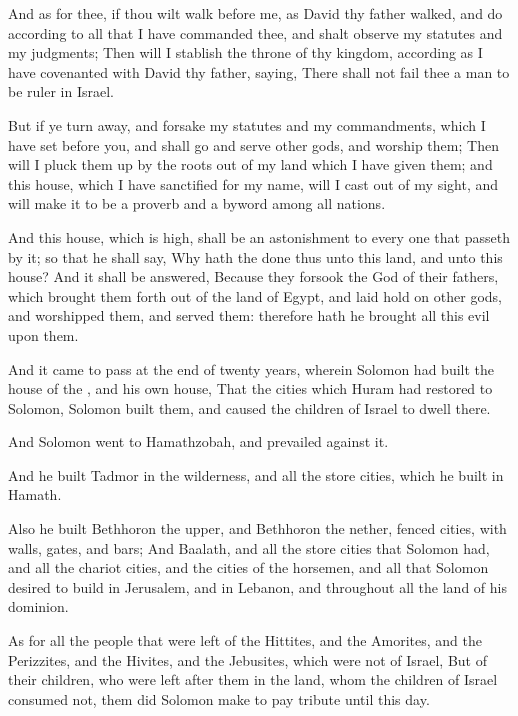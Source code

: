 \Verse And as for thee, if thou wilt walk before me, as David thy father walked, and do according to all that I have commanded thee, and shalt observe my statutes and my judgments; \Verse Then will I stablish the throne of thy kingdom, according as I have covenanted with David thy father, saying, There shall not fail thee a man to be ruler in Israel.

\Verse But if ye turn away, and forsake my statutes and my commandments, which I have set before you, and shall go and serve other gods, and worship them; \Verse Then will I pluck them up by the roots out of my land which I have given them; and this house, which I have sanctified for my name, will I cast out of my sight, and will make it to be a proverb and a byword among all nations.

\Verse And this house, which is high, shall be an astonishment to every one that passeth by it; so that he shall say, Why hath the \LORD done thus unto this land, and unto this house?  \Verse And it shall be answered, Because they forsook the \LORD God of their fathers, which brought them forth out of the land of Egypt, and laid hold on other gods, and worshipped them, and served them: therefore hath he brought all this evil upon them.


\Chapter
\Verse And it came to pass at the end of twenty years, wherein Solomon had built the house of the \LORD, and his own house, \Verse That the cities which Huram had restored to Solomon, Solomon built them, and caused the children of Israel to dwell there.

\Verse And Solomon went to Hamathzobah, and prevailed against it.

\Verse And he built Tadmor in the wilderness, and all the store cities, which he built in Hamath.

\Verse Also he built Bethhoron the upper, and Bethhoron the nether, fenced cities, with walls, gates, and bars; \Verse And Baalath, and all the store cities that Solomon had, and all the chariot cities, and the cities of the horsemen, and all that Solomon desired to build in Jerusalem, and in Lebanon, and throughout all the land of his dominion.

\Verse As for all the people that were left of the Hittites, and the Amorites, and the Perizzites, and the Hivites, and the Jebusites, which were not of Israel, \Verse But of their children, who were left after them in the land, whom the children of Israel consumed not, them did Solomon make to pay tribute until this day.

